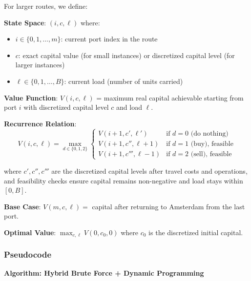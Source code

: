 \documentclass[12pt]{article}
\begin{document}
For larger routes, we define:

\textbf{State Space}: $(i, c, \ell)$ where:
\begin{itemize}
    \item $i \in \{0, 1, \ldots, m\}$: current port index in the route
    \item $c$: exact capital value (for small instances) or discretized capital level (for larger instances)
    \item $\ell \in \{0, 1, \ldots, B\}$: current load (number of units carried)
\end{itemize}

\textbf{Value Function}: $V(i, c, \ell)$ = maximum real capital achievable starting from port $i$ with discretized capital level $c$ and load $\ell$.

\textbf{Recurrence Relation}:
\[
V(i, c, \ell) = \max_{d \in \{0,1,2\}} \begin{cases}
    V(i+1, c', \ell') & \text{if } d=0 \text{ (do nothing)} \\
    V(i+1, c'', \ell+1) & \text{if } d=1 \text{ (buy), feasible} \\
    V(i+1, c''', \ell-1) & \text{if } d=2 \text{ (sell), feasible}
\end{cases}
\]

where $c', c'', c'''$ are the discretized capital levels after travel costs and operations, and feasibility checks ensure capital remains non-negative and load stays within $[0, B]$.

\textbf{Base Case}: $V(m, c, \ell) = $ capital after returning to Amsterdam from the last port.

\textbf{Optimal Value}: $\max_{c, \ell} V(0, c_0, 0)$ where $c_0$ is the discretized initial capital.

\subsubsection{Pseudocode}

\textbf{Algorithm: Hybrid Brute Force + Dynamic Programming}
\end{document}
